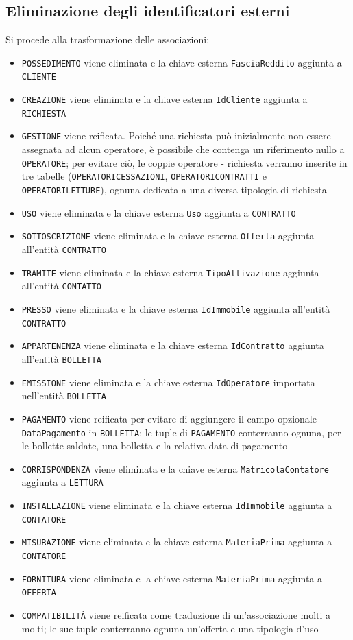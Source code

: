 \documentclass[a4paper,12pt]{report}
\begin{document}
\subsection{Eliminazione degli identificatori esterni}
Si procede alla trasformazione delle associazioni:
\begin{itemize}
    \item \texttt{POSSEDIMENTO} viene eliminata e la chiave esterna \texttt{FasciaReddito} aggiunta a \texttt{CLIENTE}
    \item \texttt{CREAZIONE} viene eliminata e la chiave esterna \texttt{IdCliente} aggiunta a \texttt{RICHIESTA}
    \item \texttt{GESTIONE} viene reificata. Poiché una richiesta può inizialmente non essere assegnata ad alcun operatore, è possibile che contenga un riferimento nullo a \texttt{OPERATORE}; per evitare ciò, le coppie operatore - richiesta verranno inserite in tre tabelle (\texttt{OPERATORI\textunderscore CESSAZIONI}, \texttt{OPERATORI\textunderscore CONTRATTI} e \texttt{OPERATORI\textunderscore LETTURE}), ognuna dedicata a una diversa tipologia di richiesta
    \item \texttt{USO} viene eliminata e la chiave esterna \texttt{Uso} aggiunta a \texttt{CONTRATTO}
    \item \texttt{SOTTOSCRIZIONE} viene eliminata e la chiave esterna \texttt{Offerta} aggiunta all'entità \texttt{CONTRATTO}
    \item \texttt{TRAMITE} viene eliminata e la chiave esterna \texttt{TipoAttivazione} aggiunta all'entità \texttt{CONTATTO}
    \item \texttt{PRESSO} viene eliminata e la chiave esterna \texttt{IdImmobile} aggiunta all'entità \texttt{CONTRATTO}
    \item \texttt{APPARTENENZA} viene eliminata e la chiave esterna \texttt{IdContratto} aggiunta all'entità \texttt{BOLLETTA}
    \item \texttt{EMISSIONE} viene eliminata e la chiave esterna \texttt{IdOperatore} importata nell'entità \texttt{BOLLETTA}
    \item \texttt{PAGAMENTO} viene reificata per evitare di aggiungere il campo opzionale \texttt{DataPagamento} in \texttt{BOLLETTA}; le tuple di \texttt{PAGAMENTO} conterranno ognuna, per le bollette saldate, una bolletta e la relativa data di pagamento
    \item \texttt{CORRISPONDENZA} viene eliminata e la chiave esterna \texttt{MatricolaContatore} aggiunta a \texttt{LETTURA}
    \item \texttt{INSTALLAZIONE} viene eliminata e la chiave esterna \texttt{IdImmobile} aggiunta a \texttt{CONTATORE}
    \item \texttt{MISURAZIONE} viene eliminata e la chiave esterna \texttt{MateriaPrima} aggiunta a \texttt{CONTATORE}
    \item \texttt{FORNITURA} viene eliminata e la chiave esterna \texttt{MateriaPrima} aggiunta a \texttt{OFFERTA}
    \item \texttt{COMPATIBILITÀ} viene reificata come traduzione di un'associazione molti a molti; le sue tuple conterranno ognuna un'offerta e una tipologia d'uso
\end{itemize}
\end{document}
